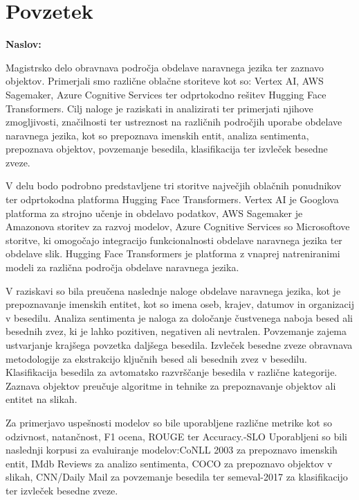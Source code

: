 \chapter{Povzetek}

\noindent\textbf{Naslov:} \ttitle
\bigskip

Magistrsko delo obravnava področja obdelave naravnega jezika ter zaznavo objektov. Primerjali smo različne oblačne storiteve kot so: Vertex AI, AWS Sagemaker, Azure Cognitive Services ter odprtokodno rešitev Hugging Face Transformers. Cilj naloge je raziskati in analizirati ter primerjati njihove zmogljivosti, značilnosti ter ustreznost na različnih področjih uporabe obdelave naravnega jezika, kot so prepoznava imenskih entit, analiza sentimenta, prepoznava objektov, povzemanje besedila, klasifikacija ter izvleček besedne zveze.

V delu bodo podrobno predstavljene tri storitve največjih oblačnih ponudnikov ter odprtokodna platforma Hugging Face Transformers. Vertex AI je Googlova platforma za strojno učenje in obdelavo podatkov, AWS Sagemaker je Amazonova storitev za razvoj modelov, Azure Cognitive Services so Microsoftove storitve, ki omogočajo integracijo funkcionalnosti obdelave naravnega jezika ter obdelave slik. Hugging Face Transformers  je platforma z vnaprej natreniranimi modeli za različna področja obdelave naravnega jezika.

V raziskavi so bila preučena naslednje naloge obdelave naravnega jezika, kot je prepoznavanje imenskih entitet, kot so imena oseb, krajev, datumov in organizacij v besedilu.
Analiza sentimenta je naloga za določanje čustvenega naboja besed ali besednih zvez, ki je lahko pozitiven, negativen ali nevtralen. Povzemanje zajema ustvarjanje krajšega povzetka daljšega besedila. Izvleček besedne zveze obravnava metodologije za ekstrakcijo ključnih besed ali besednih zvez v besedilu. 
Klasifikacija besedila za avtomatsko razvrščanje besedila v različne kategorije. Zaznava objektov preučuje algoritme in tehnike za prepoznavanje objektov ali entitet na slikah.

Za primerjavo uspešnosti modelov so bile uporabljene različne metrike kot so odzivnost, natančnost, F1 ocena, ROUGE ter Accuracy.-SLO Uporabljeni so bili naslednji korpusi za  evaluiranje modelov:CoNLL 2003 za prepoznavo imenskih entit, IMdb Reviews za analizo sentimenta, COCO za prepoznavo objektov v slikah, CNN/Daily Mail za povzemanje besedila ter semeval-2017 za klasifikacijo ter izvleček besedne zveze.


